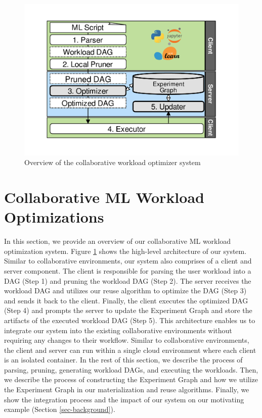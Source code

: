 \begin{figure}[h]
\centering
\includegraphics[width=0.9\columnwidth]{../images/system-workflow}
\caption{Overview of the collaborative workload optimizer system}
\label{system-workflow}
\end{figure}
\section{Collaborative ML Workload Optimizations} \label{sec-ml-workloads}
In this section, we provide an overview of our collaborative ML workload optimization system.
Figure \ref{system-workflow} shows the high-level architecture of our system.
Similar to collaborative environments, our system also comprises of a client and server component.
The client is responsible for parsing the user workload into a DAG (Step 1) and pruning the workload DAG (Step 2).
The server receives the workload DAG and utilizes our reuse algorithm to optimize the DAG (Step 3) and sends it back to the client.
Finally, the client executes the optimized DAG (Step 4) and prompts the server to update the Experiment Graph and store the artifacts of the executed workload DAG (Step 5).
This architecture enables us to integrate our system into the existing collaborative environments without requiring any changes to their workflow.
Similar to collaborative environments, the client and server can run within a single cloud environment where each client is an isolated container.
In the rest of this section, we describe the process of parsing, pruning, generating workload DAGs, and executing the workloads.
Then, we describe the process of constructing the Experiment Graph and how we utilize the Experiment Graph in our materialization and reuse algorithms. 
Finally, we show the integration process and the impact of our system on our motivating example (Section \ref{sec-background}).
